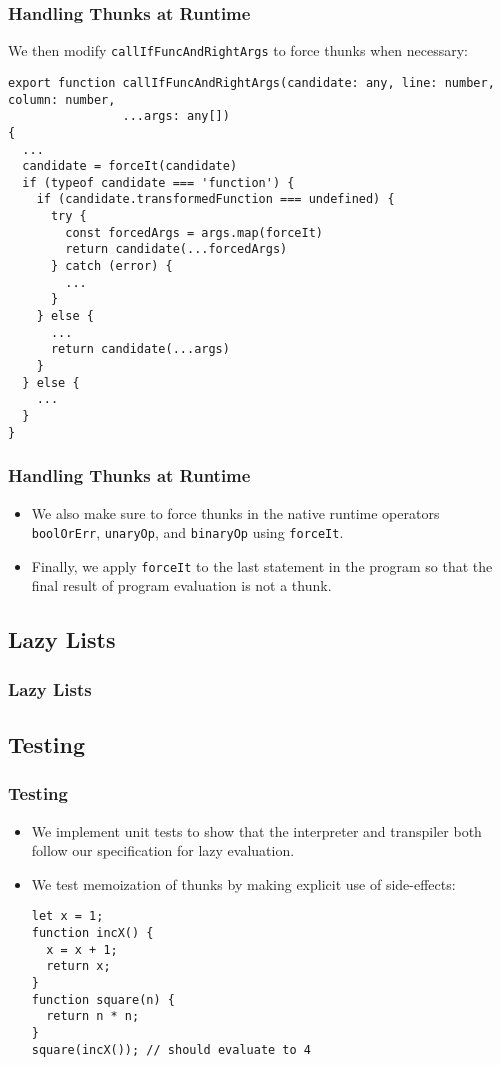 \documentclass[12pt]{beamer}
\begin{document}
\begin{frame}[fragile]
\frametitle{Handling Thunks at Runtime}
We then modify \texttt{callIfFuncAndRightArgs} to force thunks when necessary:
\begin{lstlisting}
export function callIfFuncAndRightArgs(candidate: any, line: number, column: number, 
                ...args: any[])
{
  ...
  candidate = forceIt(candidate)
  if (typeof candidate === 'function') {
    if (candidate.transformedFunction === undefined) {
      try {
        const forcedArgs = args.map(forceIt)
        return candidate(...forcedArgs)
      } catch (error) {
        ...
      }
    } else {
      ...
      return candidate(...args)
    }
  } else {
    ...
  }
}
\end{lstlisting}
\end{frame}

\begin{frame}
\frametitle{Handling Thunks at Runtime}
\begin{itemize}
\item<1-> We also make sure to force thunks in the native runtime operators \texttt{boolOrErr}, \texttt{unaryOp}, and \texttt{binaryOp} using \texttt{forceIt}.
\item<2-> Finally, we apply \texttt{forceIt} to the last statement in the program so that the final result of program evaluation is not a thunk.
\end{itemize}
\end{frame}

\subsection{Lazy Lists}

\begin{frame}
\frametitle{Lazy Lists}
\end{frame}

\subsection{Testing}

\begin{frame}[fragile]
\frametitle{Testing}
\begin{itemize}
\item<1-> We implement unit tests to show that the interpreter and transpiler both follow our specification for lazy evaluation.
\item<2-> We test memoization of thunks by making explicit use of side-effects:
\begin{lstlisting}
let x = 1;
function incX() {
  x = x + 1;
  return x;
}
function square(n) {
  return n * n;
}
square(incX()); // should evaluate to 4
\end{lstlisting}
\end{itemize}
\end{frame}
\end{document}
